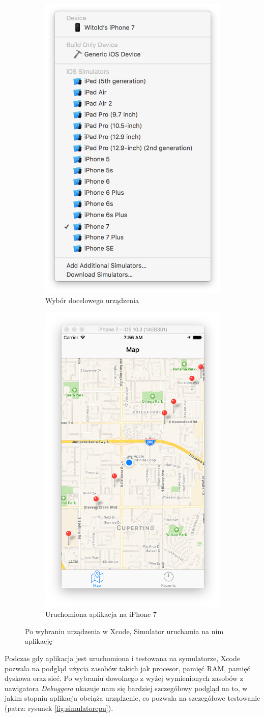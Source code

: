 \begin{figure}[ht!]
\centering
\begin{subfigure}{.5\textwidth}
  \centering
  \includegraphics[width=.4\linewidth]{images/chapter-2-image-3-target.png}
  \caption{Wybór docelowego urządzenia}
  \label{chapter-2-image-3-target}
\end{subfigure}%
\begin{subfigure}{.5\textwidth}
  \centering
  \includegraphics[width=.4\linewidth]{images/chapter-2-image-4-simulator.png}
  \caption{Uruchomiona aplikacja na iPhone 7}
  \label{chapter-2-image-4-simulator}
\end{subfigure}
\caption{Po wybraniu urządzenia w Xcode, Simulator uruchamia na nim aplikację}
\label{chapter-2-image-4-5}
\end{figure}

Podczas gdy aplikacja jest uruchomiona i testowana na symulatorze, Xcode pozwala na podgląd użycia zasobów takich jak procesor, pamięć RAM, pamięć dyskowa oraz sieć. Po wybraniu dowolnego z wyżej wymienionych zasobów z nawigatora \textit{Debuggera} ukazuje nam się bardziej szczegółowy podgląd na to, w jakim stopniu aplikacja obciąża urządzenie, co pozwala na szczegółowe testowanie (patrz: rysunek \ref{fig:simulatorcpu}).


